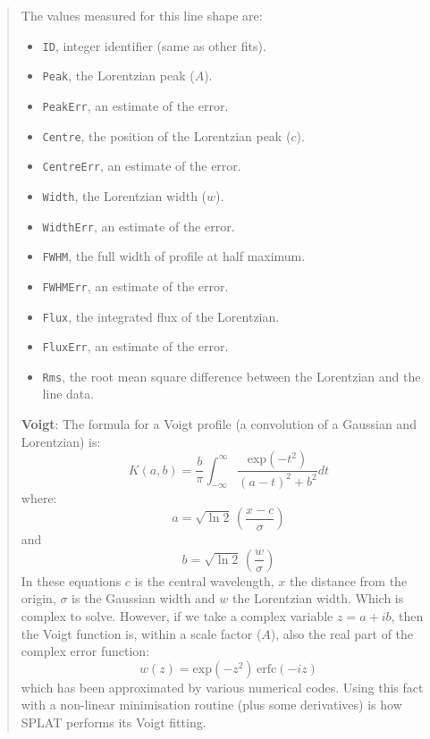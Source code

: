 \documentclass[twoside,11pt,nolof]{starlink}
\newcommand{\labelitem}[1]{\textbf{#1}}
\providecommand{\hitext}[1]{\texttt{#1}}
\begin{document}
\begin{quote}
 The values measured for this line shape are:
 \begin{itemize}
   \item \hitext{ID}, integer identifier (same as other fits).
   \item \hitext{Peak}, the Lorentzian peak ($A$).
   \item \hitext{PeakErr}, an estimate of the error.
   \item \hitext{Centre}, the position of the Lorentzian peak ($c$).
   \item \hitext{CentreErr}, an estimate of the error.
   \item \hitext{Width}, the Lorentzian width ($w$).
   \item \hitext{WidthErr}, an estimate of the error.
   \item \hitext{FWHM}, the full width of profile at half maximum.
   \item \hitext{FWHMErr}, an estimate of the error.
   \item \hitext{Flux}, the integrated flux of the Lorentzian.
   \item \hitext{FluxErr}, an estimate of the error.
   \item \hitext{Rms}, the root mean square difference between the
         Lorentzian and the line data.
 \end{itemize}

 \labelitem{Voigt}: The formula for a Voigt profile (a convolution of a
 Gaussian and Lorentzian) is:
 \[
 K(a,b) = \frac{b}{\pi}\int_{-\infty}^{\infty}\frac{\mathrm{exp}(-t^{2})}{(a-t)^{2}+b^{2}}dt
 \]
 where:
 \[
 a = \sqrt{\ln{2}} \, \left(\frac{x-c}{\sigma}\right)
 \]
 and
 \[
 b = \sqrt{\ln{2}} \, \left(\frac{w}{\sigma}\right)
 \]
 In these equations $c$ is the central wavelength, $x$ the distance
 from the origin, $\sigma$ is the
 Gaussian width and $w$ the Lorentzian width. Which is complex to
 solve. However, if we take a complex variable $z=a+ib$, then the
 Voigt function is, within a scale factor ($A$), also the real part of
 the complex error function:
 \[
 w(z) = \mathrm{exp}(-z^{2}) \, \mathrm{erfc}(-iz)
 \]
 which has been approximated by various numerical codes. Using this
 fact with a non-linear minimisation routine (plus some derivatives) is
 how SPLAT performs its Voigt fitting.


\end{quote}
\end{document}
